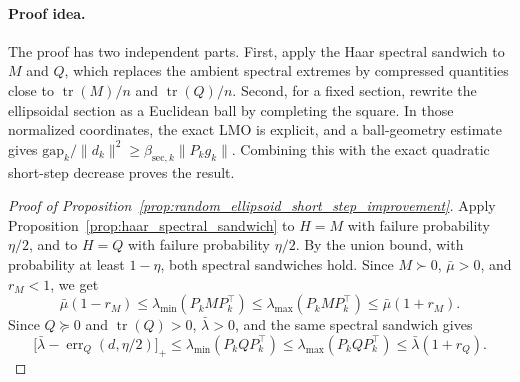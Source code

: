 \documentclass{article}
\begin{document}
\paragraph{Proof idea.}
The proof has two independent parts. First, apply the Haar spectral sandwich to
\(M\) and \(Q\), which replaces the ambient spectral extremes by compressed
quantities close to \(\operatorname{tr}(M)/n\) and \(\operatorname{tr}(Q)/n\).
Second, for a fixed section, rewrite the ellipsoidal section as a Euclidean
ball by completing the square. In those normalized coordinates, the exact LMO is
explicit, and a ball-geometry estimate gives
\(\mathrm{gap}_k/\|d_k\|^2\ge
\beta_{\mathrm{sec},k}\|P_kg_k\|\). Combining this with the exact quadratic
short-step decrease proves the result.
\begin{proof}[Proof of Proposition~\ref{prop:random_ellipsoid_short_step_improvement}]
Apply Proposition~\ref{prop:haar_spectral_sandwich} to \(H=M\) with failure
probability \(\eta/2\), and to \(H=Q\) with failure probability \(\eta/2\). By
the union bound, with probability at least \(1-\eta\), both spectral sandwiches
hold. Since \(M\succ0\), \(\bar\mu>0\), and \(r_M<1\), we get
\[
\bar\mu(1-r_M)
\le
\lambda_{\min}(P_kMP_k^\top)
\le
\lambda_{\max}(P_kMP_k^\top)
\le
\bar\mu(1+r_M).
\]
Since \(Q\succeq0\) and \(\operatorname{tr}(Q)>0\), \(\bar\lambda>0\), and the
same spectral sandwich gives
\[
\bigl[\bar\lambda-\operatorname{err}_Q(d,\eta/2)\bigr]_+
\le
\lambda_{\min}(P_kQP_k^\top)
\le
\lambda_{\max}(P_kQP_k^\top)
\le
\bar\lambda(1+r_Q).
\]


\end{proof}
\end{document}
